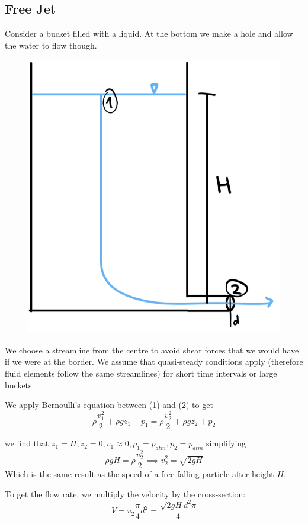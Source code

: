 \subsection{Free Jet}
Consider a bucket filled with a liquid. At the bottom we make a hole and allow the water to flow though.
\begin{figure}[H]
	\centering
	\includegraphics[width=0.3\linewidth]{Sketches/FreeJet}
	\label{fig:freejet}
\end{figure}

We choose a streamline from the centre to avoid shear forces that we would have if we were at the border. We assume that quasi-steady conditions apply (therefore fluid elements follow the same streamlines) for short time intervals or large buckets.

We apply Bernoulli's equation between (1) and (2) to get
\begin{equation*}
	\rho \frac{v_1^2}2+ \rho gz_1 + p_1 = \rho \frac{v_2^2}2+\rho gz_2 + p_2
\end{equation*}

we find that $z_1=H, z_2=0, v_1\approx 0, p_1=p_{atm}, p_2=p_{atm}$ simplifying 
\begin{equation*}
	\rho g H = \rho \frac{v_2^2}{2}\implies v_2^2=\sqrt{2gH}
\end{equation*}
Which is the same result as the speed of a free falling particle after height $H$.

To get the flow rate, we multiply the velocity by the cross-section:
\begin{equation*}
	\dot V = v_2\frac \pi 4 d^2=\frac{\sqrt{2gH}d^2\pi}4
\end{equation*}



